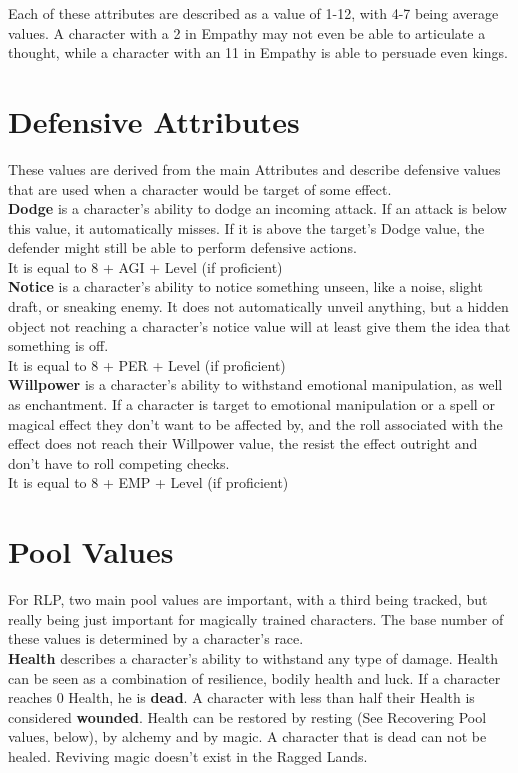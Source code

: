 Each of these attributes are described as a value of 1-12, with 4-7 being average values. A character with a 2 in Empathy may not even be able to articulate a thought, while a character with an 11 in Empathy is able to persuade even kings.

\section{Defensive Attributes}
These values are derived from the main Attributes and describe defensive values that are used when a character would be target of some effect.\\


\textbf{Dodge} is a character's ability to dodge an incoming attack. If an attack is below this value, it automatically misses. If it is above the target's Dodge value, the defender might still be able to perform defensive actions.\\
It is equal to 8 + AGI + Level (if proficient)\\


\textbf{Notice} is a character's ability to notice something unseen, like a noise, slight draft, or sneaking enemy. It does not automatically unveil anything, but a hidden object not reaching a character's notice value will at least give them the idea that something is off.\\
It is equal to 8 + PER + Level (if proficient)\\


\textbf{Willpower} is a character's ability to withstand emotional manipulation, as well as enchantment. If a character is target to emotional manipulation or a spell or magical effect they don't want to be affected by, and the roll associated with the effect does not reach their Willpower value, the resist the effect outright and don't have to roll competing checks.\\
It is equal to 8 + EMP + Level (if proficient)\\


\section{Pool Values}
For RLP, two main pool values are important, with a third being tracked, but really being just important for magically trained characters. The base number of these values is determined by a character's race.\\


\textbf{Health} describes a character's ability to withstand any type of damage. Health can be seen as a combination of resilience, bodily health and luck. If a character reaches 0 Health, he is \textbf{dead}. A character with less than half their Health is considered \textbf{wounded}. Health can be restored by resting (See Recovering Pool values, below), by alchemy and by magic. A character that is dead can not be healed. Reviving magic doesn't exist in the Ragged Lands.\\


